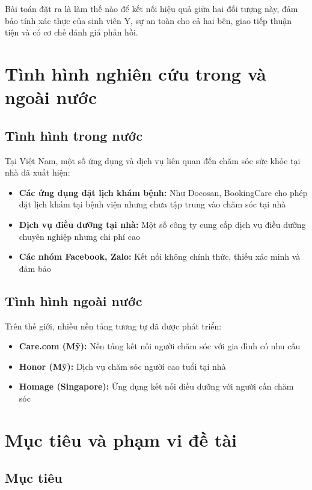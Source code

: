 \documentclass[12pt,a4paper]{report}
\begin{document}
Bài toán đặt ra là làm thế nào để kết nối hiệu quả giữa hai đối tượng này, đảm bảo tính xác thực của sinh viên Y, sự an toàn cho cả hai bên, giao tiếp thuận tiện và có cơ chế đánh giá phản hồi.

\section{Tình hình nghiên cứu trong và ngoài nước}

\subsection{Tình hình trong nước}

Tại Việt Nam, một số ứng dụng và dịch vụ liên quan đến chăm sóc sức khỏe tại nhà đã xuất hiện:

\begin{itemize}
    \item \textbf{Các ứng dụng đặt lịch khám bệnh:} Như Docosan, BookingCare cho phép đặt lịch khám tại bệnh viện nhưng chưa tập trung vào chăm sóc tại nhà
    \item \textbf{Dịch vụ điều dưỡng tại nhà:} Một số công ty cung cấp dịch vụ điều dưỡng chuyên nghiệp nhưng chi phí cao
    \item \textbf{Các nhóm Facebook, Zalo:} Kết nối không chính thức, thiếu xác minh và đảm bảo
\end{itemize}

\subsection{Tình hình ngoài nước}

Trên thế giới, nhiều nền tảng tương tự đã được phát triển:

\begin{itemize}
    \item \textbf{Care.com (Mỹ):} Nền tảng kết nối người chăm sóc với gia đình có nhu cầu
    \item \textbf{Honor (Mỹ):} Dịch vụ chăm sóc người cao tuổi tại nhà
    \item \textbf{Homage (Singapore):} Ứng dụng kết nối điều dưỡng với người cần chăm sóc
\end{itemize}

\section{Mục tiêu và phạm vi đề tài}

\subsection{Mục tiêu}
\end{document}
